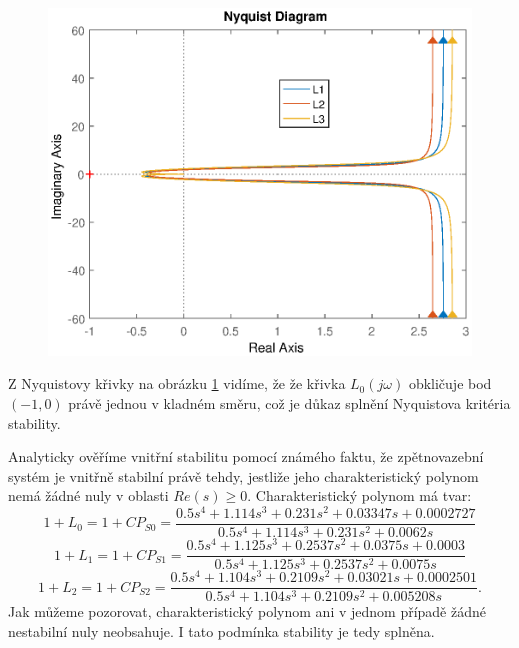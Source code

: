 \documentclass[a4paper,11pt]{article}
\begin{document}
\begin{figure}[htbp]
	\begin{center}
	\includegraphics[scale = 1.0]{obrazky/nyquist.eps}
	\label{fig:Nyquistovo_kriterium_stability}
	\end{center}
\end{figure}

Z Nyquistovy křivky na obrázku \ref{fig:Nyquistovo_kriterium_stability} vidíme, že že křivka $ L_{0}\left ( j\omega \right )  $ obkličuje bod $ \left ( -1,0 \right ) $ právě jednou v kladném směru, což je důkaz splnění Nyquistova kritéria stability.


\newpage 
Analyticky ověříme vnitřní stabilitu pomocí známého faktu, že zpětnovazební systém je vnitřně stabilní právě tehdy, jestliže jeho charakteristický polynom nemá žádné nuly v oblasti $ Re\left ( s \right )\geq 0. $
Charakteristický polynom má tvar:
\begin{equation}
1+L_{0}=1+CP_{S0}=\frac{0.5 s^4 + 1.114 s^3 + 0.231 s^2 + 0.03347 s + 0.0002727}{ 0.5 s^4 + 1.114 s^3 + 0.231 s^2 + 0.0062 s}
\end{equation}
\begin{equation}
1+L_{1}=1+CP_{S1}=\frac{0.5 s^4 + 1.125 s^3 + 0.2537 s^2 + 0.0375 s + 0.0003}{0.5 s^4 + 1.125 s^3 + 0.2537 s^2 + 0.0075 s}
\end{equation}
\begin{equation}
1+L_{2}=1+CP_{S2}=\frac{0.5 s^4 + 1.104 s^3 + 0.2109 s^2 + 0.03021 s + 0.0002501}{0.5 s^4 + 1.104 s^3 + 0.2109 s^2 + 0.005208 s}.
\end{equation}
Jak můžeme pozorovat, charakteristický polynom ani v jednom případě žádné nestabilní nuly neobsahuje. I tato podmínka stability je tedy splněna.
\end{document}

